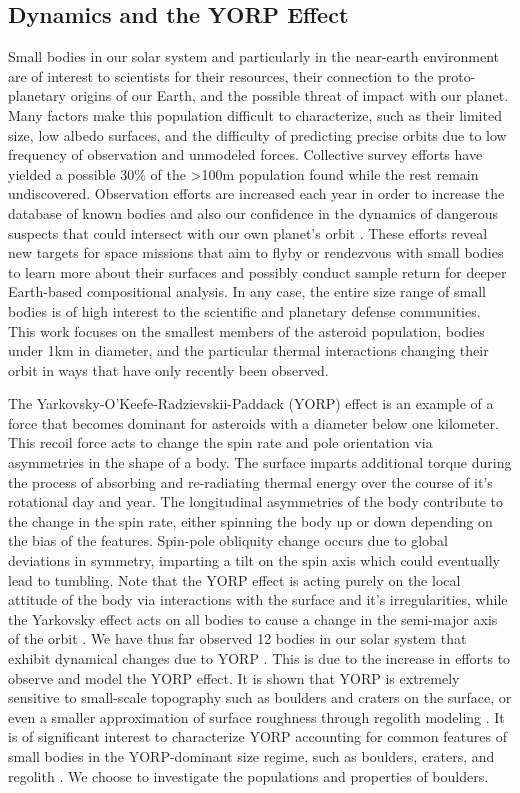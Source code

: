 \subsection{Dynamics and the YORP Effect}
Small bodies in our solar system and particularly in the near-earth environment are of interest to scientists for their resources, their connection to the proto-planetary origins of our Earth, and the possible threat of impact with our planet. Many factors make this population difficult to characterize, such as their limited size, low albedo surfaces, and the difficulty of predicting precise orbits due to low frequency of observation and unmodeled forces. Collective survey efforts have yielded a possible $30\%$ of the >100m population found while the rest remain undiscovered. Observation efforts are increased each year in order to increase the database of known bodies and also our confidence in the dynamics of dangerous suspects that could intersect with our own planet's orbit \cite{Jones2016}\cite{Mainzer2011}. These efforts reveal new targets for space missions that aim to flyby or rendezvous with small bodies to learn more about their surfaces and possibly conduct sample return for deeper Earth-based compositional analysis. In any case, the entire size range of small bodies is of high interest to the scientific and planetary defense communities. This work focuses on the smallest members of the asteroid population, bodies under 1km in diameter, and the particular thermal interactions changing their orbit in ways that have only recently been observed.

 The Yarkovsky-O'Keefe-Radzievskii-Paddack (YORP) effect is an example of a force that becomes dominant for asteroids with a diameter below one kilometer. This recoil force acts to change the spin rate and pole orientation via asymmetries in the shape of a body. The surface imparts additional torque during the process of absorbing and re-radiating thermal energy over the course of it's rotational day and year. The longitudinal asymmetries of the body contribute to the change in the spin rate, either spinning the body up or down depending on the bias of the features. Spin-pole obliquity change occurs due to global deviations in symmetry, imparting a tilt on the spin axis which could eventually lead to tumbling. Note that the YORP effect is acting purely on the local attitude of the body via interactions with the surface and it's irregularities, while the Yarkovsky effect acts on all bodies to cause a change in the semi-major axis of the orbit \cite{Vokrouhlicky2000}. We have thus far observed 12 bodies in our solar system that exhibit dynamical changes due to YORP \cite{Durech2023}. This is due to the increase in efforts to observe and model the YORP effect. It is shown that YORP is extremely sensitive to small-scale topography such as boulders and craters on the surface, or even a smaller approximation of surface roughness through regolith modeling \cite{Statler2009}\cite{Rozitis2011}\cite{Rozitis2013}. It is of significant interest to characterize YORP accounting for common features of small bodies in the YORP-dominant size regime, such as boulders, craters, and regolith \cite{Walsh2019}. We choose to investigate the populations and properties of boulders. 


